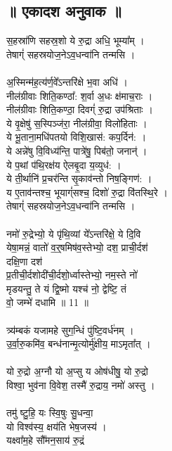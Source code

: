 \subsection{॥ एकादश अनुवाक ॥}
स॒हस्रा॑णि सहस्र॒शो ये रु॒द्रा अधि॒ भूम्या᳚म् ।\\
तेषाग्ं॑ सहस्रयोज॒नेऽव॒धन्वा॑नि तन्मसि ।\\
\\
अ॒स्मिन्म॑ह॒त्य॑र्ण॒वे᳚ऽन्तरि॑क्षे भ॒वा अधि॑ ।\\
नील॑ग्रीवाः शिति॒कण्ठा᳚: श॒र्वा अ॒धः क्ष॑माच॒राः ।\\
नील॑ग्रीवाः शिति॒कण्ठा॒ दिवग्ं॑ रु॒द्रा उप॑श्रिताः ।\\
ये वृ॒क्षेषु॑ स॒स्पिञ्ज॑रा॒ नील॑ग्रीवा॒ विलो॑हिताः ।\\
ये भू॒ताना॒मधि॑पतयो विशि॒खास॑: कप॒र्दिन॑: ।\\
ये अन्ने॑षु वि॒विध्य॑न्ति॒ पात्रे॑षु॒ पिब॑तो॒ जनान्॑ ।\\
ये प॒थां प॑थि॒रक्ष॑य ऐलबृ॒दा य॒व्युध॑: ।\\
ये ती॒र्थानि॑ प्र॒चर॑न्ति सृ॒काव॑न्तो निष॒ङ्गिण॑: ।\\
य ए॒ताव॑न्तश्च॒ भूयाग्ं॑सश्च॒ दिशो॑ रु॒द्रा वि॑तस्थि॒रे ।\\
तेषाग्ं॑ सहस्रयोज॒नेऽव॒धन्वा॑नि तन्मसि ।\\
\\
नमो॑ रु॒द्रेभ्यो॒ ये पृ॑थि॒व्यां ये᳚ऽन्तरि॑क्षे॒ ये दि॒वि\\
येषा॒मन्नं॒ वातो॑ व॒र्॒षमिष॑व॒स्तेभ्यो॒ दश॒ प्राची॒र्दश॑\\
दक्षि॒णा दश॑ \\
प्र॒तीची॒र्दशोदी॑ची॒र्दशो॒र्ध्वास्तेभ्यो॒ नम॒स्ते नो॑\\
मृडयन्तु॒ ते यं द्वि॒ष्मो यश्च॑ नो॒ द्वेष्टि॒ तं\\
वो॒ जम्भे॑ दधामि ॥ 11 ॥\\
\\
त्र्य॑म्बकं यजामहे सुग॒न्धिं पु॑ष्टि॒वर्ध॑नम् ।\\
उ॒र्वा॒रु॒कमि॑व॒ बन्ध॑नान्मृ॒त्योर्मु॑क्षीय॒ माऽमृता᳚त् ।\\
\\
यो रु॒द्रो अ॒ग्नौ यो अ॒प्सु य ओष॑धीषु॒ यो रु॒द्रो\\
विश्वा॒ भुव॑ना वि॒वेश॒ तस्मै॑ रु॒द्राय॒ नमो॑ अस्तु ।\\
\\
तमु॑ ष्टु॒हि॒ यः स्वि॒षुः सु॒धन्वा॒\\
यो विश्व॑स्य॒ क्षय॑ति भेष॒जस्य॑ ।\\
यक्ष्वा᳚म॒हे सौ᳚मन॒साय॑ रु॒द्रं\\
